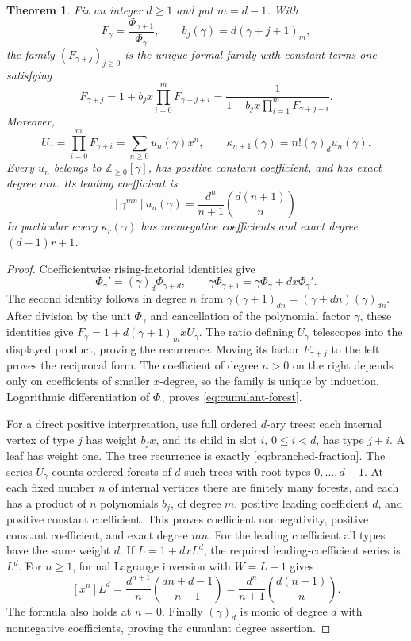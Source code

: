 \documentclass[11pt]{article}
\newtheorem{theorem}{Theorem}
\begin{document}
\begin{theorem}\label{thm:formal-cumulant-fraction}
Fix an integer $d\ge1$ and put $m=d-1$. With
\[
 F_\gamma=\frac{\Phi_{\gamma+1}}{\Phi_\gamma},
 \qquad b_j(\gamma)=d(\gamma+j+1)_m,
\]
the family $(F_{\gamma+j})_{j\ge0}$ is the unique formal family with
constant terms one satisfying
\[
 F_{\gamma+j}
 =1+b_jx\prod_{i=0}^{m}F_{\gamma+j+i}
 =\frac{1}{1-b_jx\prod_{i=1}^{m}F_{\gamma+j+i}}.          \tag{CF}\label{eq:branched-fraction}
\]
Moreover,
\[
 U_\gamma=\prod_{i=0}^{m}F_{\gamma+i}
 =\sum_{n\ge0}u_n(\gamma)x^n,\qquad
 \kappa_{n+1}(\gamma)=n!(\gamma)_d u_n(\gamma).           \tag{CU}\label{eq:cumulant-forest}
\]
Every $u_n$ belongs to $\mathbb Z_{\ge0}[\gamma]$, has positive
constant coefficient, and has exact degree $mn$. Its leading
coefficient is
\[
 [\gamma^{mn}]u_n(\gamma)
 =\frac{d^n}{n+1}\binom{d(n+1)}n.                       \tag{LC}\label{eq:forest-leading}
\]
In particular every $\kappa_r(\gamma)$ has nonnegative coefficients
and exact degree $(d-1)r+1$.
\end{theorem}
\begin{proof}
Coefficientwise rising-factorial identities give
\[
 \Phi_\gamma'=(\gamma)_d\Phi_{\gamma+d},\qquad
 \gamma\Phi_{\gamma+1}
       =\gamma\Phi_\gamma+dx\Phi_\gamma'.
\]
The second identity follows in degree $n$ from
$\gamma(\gamma+1)_{dn}=(\gamma+dn)(\gamma)_{dn}$.
After division by the unit $\Phi_\gamma$ and cancellation of the
polynomial factor $\gamma$, these identities give
$F_\gamma=1+d(\gamma+1)_m xU_\gamma$.
The ratio defining $U_\gamma$ telescopes into the displayed product,
proving the recurrence. Moving its factor $F_{\gamma+j}$ to the
left proves the reciprocal form. The coefficient of degree $n>0$
on the right depends only on coefficients of smaller $x$-degree,
so the family is unique by induction. Logarithmic differentiation
of $\Phi_\gamma$ proves \eqref{eq:cumulant-forest}.

For a direct positive interpretation, use full ordered $d$-ary trees:
each internal vertex of type $j$ has weight $b_jx$, and its child in
slot $i$, $0\le i<d$, has type $j+i$. A leaf has weight one.
The tree recurrence is exactly \eqref{eq:branched-fraction}.
The series $U_\gamma$ counts ordered forests of $d$ such trees with
root types $0,\ldots,d-1$. At each fixed number $n$ of internal
vertices there are finitely many forests, and each has a product
of $n$ polynomials $b_j$, of degree $m$, positive leading coefficient
$d$, and positive constant coefficient. This proves coefficient
nonnegativity, positive constant coefficient, and exact degree $mn$.
For the leading coefficient all types have the same weight $d$.
If $L=1+dxL^d$, the required leading-coefficient series is $L^d$.
For $n\ge1$, formal Lagrange inversion with $W=L-1$ gives
\[
 [x^n]L^d
 =\frac{d^{n+1}}n\binom{dn+d-1}{n-1}
 =\frac{d^n}{n+1}\binom{d(n+1)}n.
\]
The formula also holds at $n=0$. Finally $(\gamma)_d$ is monic
of degree $d$ with nonnegative coefficients, proving the cumulant
degree assertion.
\end{proof}
\end{document}
